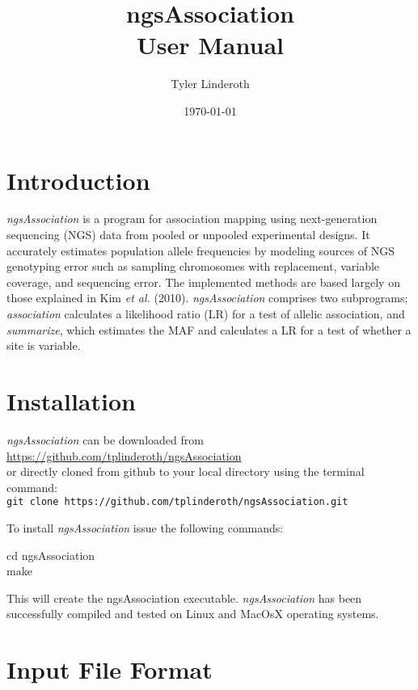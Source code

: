 \documentclass[12pt]{article}
\title{{\bf ngsAssociation}\\User Manual}
\author{Tyler Linderoth}
\date{\today}
\newenvironment{codeblock}{ \begin{framed}\ttfamily}{ \end{framed} }
\begin{document}
\maketitle

\tableofcontents
\newpage

\section{Introduction}
\textit{ngsAssociation} is a program for association mapping using next-generation sequencing (NGS) data from pooled or unpooled experimental designs. It accurately estimates population allele frequencies by modeling sources of NGS genotyping error such as sampling chromosomes with replacement, variable coverage, and sequencing error. The implemented methods are based largely on those explained in Kim {\it et al.} (2010). \textit{ngsAssociation} comprises two subprograms; \textit{association} calculates a likelihood ratio (LR) for a test of allelic association, and \textit{summarize}, which estimates the MAF and calculates a LR for a test of whether a site is variable.

\section{Installation}
\setlength{\parindent}{0cm}
\textit{ngsAssociation} can be downloaded from\\\url{https://github.com/tplinderoth/ngsAssociation}\\or directly cloned from 
github to your local directory using the terminal command:\\
\texttt{git clone https://github.com/tplinderoth/ngsAssociation.git}

\vspace{5mm}

To install \textit{ngsAssociation} issue the following commands:

\begin{codeblock}
cd ngsAssociation\\
make
\end{codeblock}

This will create the ngsAssociation executable. \textit{ngsAssociation} has been successfully compiled and tested on Linux and MacOsX operating systems.

\section{Input File Format}
\end{document}
